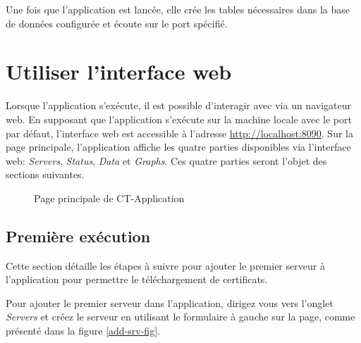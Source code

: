 \documentclass{article}
\begin{document}
Une fois que l'application est lancée, elle crée les tables nécessaires dans la base de données configurée et écoute sur le port spécifié.

\clearpage
\section{Utiliser l'interface web}

Lorsque l'application s'exécute, il est possible d'interagir avec via un navigateur web.  En supposant que l'application s'exécute sur la machine locale avec le port par défaut, l'interface web est accessible à l'adresse \url{http://localhost:8090}.  Sur la page principale, l'application affiche les quatre parties disponibles via l'interface web: \emph{Servers}, \emph{Status}, \emph{Data} et \emph{Graphs}.  Ces quatre parties seront l'objet des sections suivantes.

\begin{figure}[h]
\noindent{}
\caption{Page principale de CT-Application}
\label{home-fig}
\end{figure}

\subsection{Première exécution}

Cette section détaille les étapes à suivre pour ajouter le premier serveur à l'application pour permettre le téléchargement de certificats.

Pour ajouter le premier serveur dans l'application, dirigez vous vers l'onglet \emph{Servers} et créez le serveur en utilisant le formulaire à gauche sur la page, comme présenté dans la figure \ref{add-srv-fig}.
\end{document}
